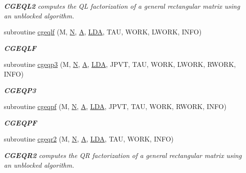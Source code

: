 \begin{DoxyCompactItemize}
\begin{DoxyCompactList}\small\item\em {\bfseries C\+G\+E\+Q\+L2} computes the Q\+L factorization of a general rectangular matrix using an unblocked algorithm. \end{DoxyCompactList}\item 
subroutine \hyperlink{group__complexGEcomputational_ga085bbc018c80dcb9db6bac7f1edb0d5e}{cgeqlf} (M, \hyperlink{polmisc_8c_a0240ac851181b84ac374872dc5434ee4}{N}, \hyperlink{classA}{A}, \hyperlink{example__user_8c_ae946da542ce0db94dced19b2ecefd1aa}{L\+D\+A}, T\+A\+U, W\+O\+R\+K, L\+W\+O\+R\+K, I\+N\+F\+O)
\begin{DoxyCompactList}\small\item\em {\bfseries C\+G\+E\+Q\+L\+F} \end{DoxyCompactList}\item 
subroutine \hyperlink{group__complexGEcomputational_ga3947eb2e884bf32f7380f22c501151e9}{cgeqp3} (M, \hyperlink{polmisc_8c_a0240ac851181b84ac374872dc5434ee4}{N}, \hyperlink{classA}{A}, \hyperlink{example__user_8c_ae946da542ce0db94dced19b2ecefd1aa}{L\+D\+A}, J\+P\+V\+T, T\+A\+U, W\+O\+R\+K, L\+W\+O\+R\+K, R\+W\+O\+R\+K, I\+N\+F\+O)
\begin{DoxyCompactList}\small\item\em {\bfseries C\+G\+E\+Q\+P3} \end{DoxyCompactList}\item 
subroutine \hyperlink{group__complexGEcomputational_gab3dc4404de0aff42eebca8b7bc8de6f3}{cgeqpf} (M, \hyperlink{polmisc_8c_a0240ac851181b84ac374872dc5434ee4}{N}, \hyperlink{classA}{A}, \hyperlink{example__user_8c_ae946da542ce0db94dced19b2ecefd1aa}{L\+D\+A}, J\+P\+V\+T, T\+A\+U, W\+O\+R\+K, R\+W\+O\+R\+K, I\+N\+F\+O)
\begin{DoxyCompactList}\small\item\em {\bfseries C\+G\+E\+Q\+P\+F} \end{DoxyCompactList}\item 
subroutine \hyperlink{group__complexGEcomputational_ga134d9e0dc9857945b85acc090ca19ade}{cgeqr2} (M, \hyperlink{polmisc_8c_a0240ac851181b84ac374872dc5434ee4}{N}, \hyperlink{classA}{A}, \hyperlink{example__user_8c_ae946da542ce0db94dced19b2ecefd1aa}{L\+D\+A}, T\+A\+U, W\+O\+R\+K, I\+N\+F\+O)
\begin{DoxyCompactList}\small\item\em {\bfseries C\+G\+E\+Q\+R2} computes the Q\+R factorization of a general rectangular matrix using an unblocked algorithm. \end{DoxyCompactList}\item 

\end{DoxyCompactItemize}
